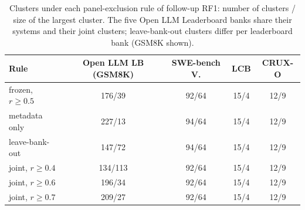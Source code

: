 \begin{table}[tbp]
\centering\footnotesize
\caption{Clusters under each panel-exclusion rule of follow-up RF1: number of clusters / size of the largest cluster. The five Open LLM Leaderboard banks share their systems and their joint clusters; leave-bank-out clusters differ per leaderboard bank (GSM8K shown).}
\label{tab:robclustcount}
\begin{tabular}{@{}lcccc@{}}
\toprule
Rule & Open LLM LB (GSM8K) & SWE-bench V. & LCB & CRUX-O \\
\midrule
frozen, $r\ge0.5$ & 176/39 & 92/64 & 15/4 & 12/9 \\
metadata only & 227/13 & 94/64 & 15/4 & 12/9 \\
leave-bank-out & 147/72 & 94/64 & 15/4 & 12/9 \\
joint, $r\ge0.4$ & 134/113 & 92/64 & 15/4 & 12/9 \\
joint, $r\ge0.6$ & 196/34 & 92/64 & 15/4 & 12/9 \\
joint, $r\ge0.7$ & 209/27 & 92/64 & 15/4 & 12/9 \\
\bottomrule
\end{tabular}
\end{table}
